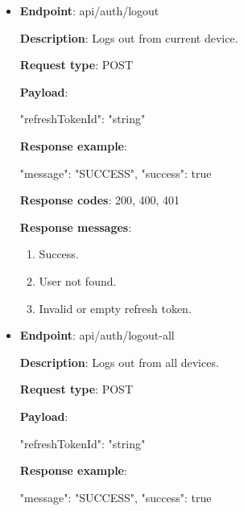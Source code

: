 \begin{itemize}
    \textbf{Response codes}: 200, 400, 401

    \textbf{Response messages}:
    \begin{enumerate}
        \item Success.
        \item Invalid or empty refresh token.
    \end{enumerate}

    \item \textbf{Endpoint}: api/auth/logout

    \textbf{Description}: Logs out from current device.

    \textbf{Request type}: POST

    \textbf{Payload}:

    \begin{spverbatim}
    {
        "refreshTokenId": "string"
    }
    \end{spverbatim}

    \textbf{Response example}:

    \begin{spverbatim}
    {
        "message": "SUCCESS",
        "success": true
    }
    \end{spverbatim}

    \textbf{Response codes}: 200, 400, 401

    \textbf{Response messages}:
    \begin{enumerate}
        \item Success.
        \item User not found.
        \item Invalid or empty refresh token.
    \end{enumerate}

    \item \textbf{Endpoint}: api/auth/logout-all

    \textbf{Description}: Logs out from all devices.

    \textbf{Request type}: POST

    \textbf{Payload}:

    \begin{spverbatim}
    {
        "refreshTokenId": "string"
    }
    \end{spverbatim}

    \textbf{Response example}:

    \begin{spverbatim}
    {
        "message": "SUCCESS",
        "success": true
    }
    \end{spverbatim}


\end{itemize}
